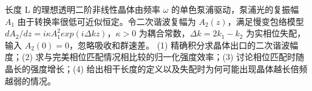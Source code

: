 长度 L 的理想透明二阶非线性晶体由频率 \(\omega \) 的单色泵浦驱动，泵浦光的复振幅 \(A_{1}\) 由于转换率很低可近似恒定。令二次谐波复幅为 \(A_{2}(z)\)，满足慢变包络模型 \(dA_{2}/dz=i\kappa A_{1}^{2}exp(i\Delta kz)\)，\(\kappa >0\) 为耦合常数，\(\Delta k=2k_{1}-k_{2}\) 为实相位失配，输入 \(A_{2}(0)=0\)，忽略吸收和群速差。
(1) 精确积分求晶体出口的二次谐波幅度；(2) 求与完美相位匹配情况相比较的归一化强度效率；(3) 讨论相位匹配时随晶长的强度增长；(4) 给出相干长度的定义以及失配时为何可能出现晶体越长倍频越弱的情况。
